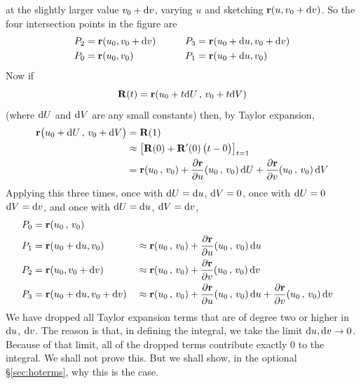at the slightly larger value $v_0+\mathrm{d}v$, varying $u$ and 
sketching $\mathbf{r}(u,v_0+\mathrm{d}v)$. So the four intersection points in 
the figure are
\begin{alignat*}{3}
P_2&=\mathbf{r}(u_0, v_0+\mathrm{d}v) &\qquad
   P_3&=\mathbf{r}(u_0+\mathrm{d}u, v_0+\mathrm{d}v) \\
P_0&=\mathbf{r}(u_0, v_0) &
   P_1&=\mathbf{r}(u_0+\mathrm{d}u, v_0) 
\end{alignat*}
Now if
\begin{equation*}
\mathbf{R}(t) = \mathbf{r}(u_0+t\mathrm{d}U\,,\,v_0+t\mathrm{d}V)
\end{equation*}
(where $\mathrm{d}U$ and $\mathrm{d}V$ are any small constants)
then, by Taylor expansion,
\begin{align*}
\mathbf{r}\big(u_0+\mathrm{d}U\,,\,v_0+\mathrm{d}V\big)
&=\mathbf{R}(1) \\
&\approx \big[\mathbf{R}(0) +\mathbf{R}'(0)\,\big(t-0\big)\big]_{t=1} \\
&=\mathbf{r}(u_0\,,\,v_0)
   +\frac{\partial\mathbf{r}}{\partial u}(u_0\,,\,v_0)\,\mathrm{d}U
   +\frac{\partial\mathbf{r}}{\partial v}(u_0\,,\,v_0)\,\mathrm{d}V
\end{align*}
Applying this three times, once with $\mathrm{d}U=\mathrm{d}u$, $\mathrm{d}V=0$,
once with $\mathrm{d}U=0$ $\mathrm{d}V=\mathrm{d}v$, and once with 
$\mathrm{d}U=\mathrm{d}u$, $\mathrm{d}V=\mathrm{d}v$,
\begin{alignat*}{3}
P_0&=\mathbf{r}(u_0\,,\,v_0) \\
P_1&=\mathbf{r}(u_0+\mathrm{d}u, v_0)
   &&\approx \mathbf{r}(u_0\,,\,v_0)
   +\frac{\partial\mathbf{r}}{\partial u}(u_0\,,\,v_0)\,\mathrm{d}u \\
P_2&=\mathbf{r}(u_0, v_0+\mathrm{d}v)
   &&\approx \mathbf{r}(u_0\,,\,v_0)
   +\frac{\partial\mathbf{r}}{\partial v}(u_0\,,\,v_0)\,\mathrm{d}v \\
P_3&=\mathbf{r}(u_0+\mathrm{d}u, v_0+\mathrm{d}v)
   &&\approx\mathbf{r}(u_0\,,\,v_0)
   +\frac{\partial\mathbf{r}}{\partial u}(u_0\,,\,v_0)\,\mathrm{d}u
   +\frac{\partial\mathbf{r}}{\partial v}(u_0\,,\,v_0)\,\mathrm{d}v 
\end{alignat*}
We have dropped all Taylor expansion terms that are of degree two or higher 
in $\mathrm{d}u$, $\mathrm{d}v$. The reason is that, in defining the integral, we take 
the limit $\mathrm{d}u,\mathrm{d}v\rightarrow 0$. Because of that limit, 
all of the dropped terms contribute exactly $0$ to the integral. 
We shall not prove this. But we shall show, in the optional
\S\ref{sec:hoterms}, why this is the case.  

